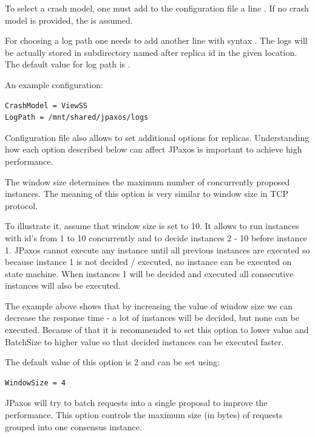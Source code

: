 To select a crash model, one must add to the configuration file a line
. If no crash model is provided, the
 is assumed.

For choosing a log path one needs to add another line with syntax . The logs will be actually stored in subdirectory named after replica
id in the given location. The default value for log path is .

An example configuration:

\begin{Verbatim}[commandchars=@\[\]]
CrashModel = ViewSS
LogPath = /mnt/shared/jpaxos/logs
\end{Verbatim}


\label{config:replica-options}
Configuration file also allows to set additional options for replicas.
Understanding how each option described below can affect JPaxos is important to
achieve high performance.


\label{config:window-size}
The window size determines the maximum number of concurrently proposed
instances. The meaning of this option is very similar to window size in TCP
protocol.

To illustrate it, assume that window size is set to 10. It allows to run
instances with id's from 1 to 10 concurrently and to decide instances 2 - 10
before instance 1. JPaxos cannot execute any instance until all previous
instances are executed so because instance 1 is not decided / executed, no
instance can be executed on state machine. When instances 1 will be
decided and executed all consecutive instances will also be executed.

The example above shows that by increasing the value of window size we can
decrease the response time - a lot of instances will be decided, but none can
be executed. Because of that it is recommended to set this option to lower
value and BatchSize to higher value so that decided instances can be executed
faster.

The default value of this option is 2 and can be set using:
\begin{Verbatim}
WindowSize = 4
\end{Verbatim}

\label{config:batch-size}
JPaxos will try to batch requests into a single proposal to improve the
performance. This option controls the maximum size (in bytes) of requests
grouped into one consensus instance.

